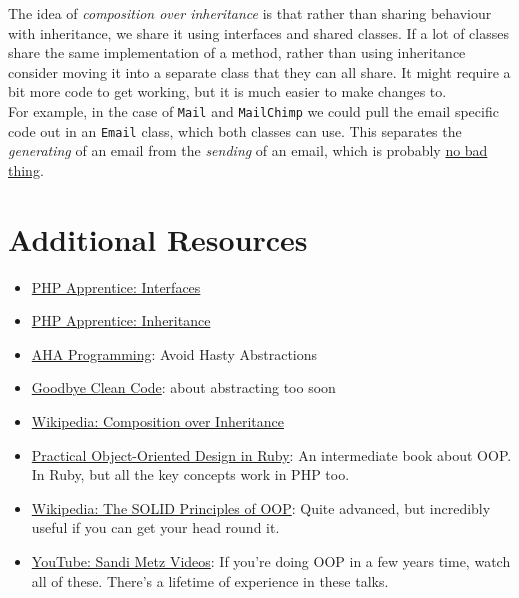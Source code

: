 
The idea of \textit{composition over inheritance} is that rather than sharing behaviour with inheritance, we share it using interfaces and shared classes. If a lot of classes share the same implementation of a method, rather than using inheritance consider moving it into a separate class that they can all share. It might require a bit more code to get working, but it is much easier to make changes to.
\\

For example, in the case of \texttt{Mail} and \texttt{MailChimp} we could pull the email specific code out in an \texttt{Email} class, which both classes can use. This separates the \textit{generating} of an email from the \textit{sending} of an email, which is probably \href{https://en.wikipedia.org/wiki/Single-responsibility_principle}{no bad thing}.



\section{Additional Resources}

\begin{itemize}[leftmargin=*]
    \item \href{https://phpapprentice.com/interfaces.html}{PHP Apprentice: Interfaces}
    \item \href{https://phpapprentice.com/classes-inheritance.html}{PHP Apprentice: Inheritance}
    \item \href{https://kentcdodds.com/blog/aha-programming/}{AHA Programming}: Avoid Hasty Abstractions
    \item \href{https://overreacted.io/goodbye-clean-code/}{Goodbye Clean Code}: about abstracting too soon
    \item \href{https://en.wikipedia.org/wiki/Composition\_over\_inheritance}{Wikipedia: Composition over Inheritance}
    \item \href{https://www.poodr.com}{Practical Object-Oriented Design in Ruby}: An intermediate book about OOP. In Ruby, but all the key concepts work in PHP too.
    \item \href{https://en.wikipedia.org/wiki/SOLID}{Wikipedia: The SOLID Principles of OOP}: Quite advanced, but incredibly useful if you can get your head round it.
    \item \href{https://www.youtube.com/channel/UCk3yOoaVtORwXipuLZ3jWNg}{YouTube: Sandi Metz Videos}: If you're doing OOP in a few years time, watch all of these. There's a lifetime of experience in these talks.
\end{itemize}
